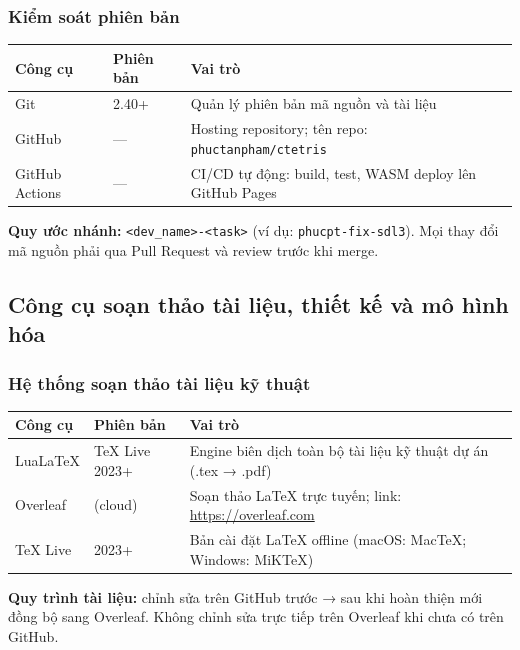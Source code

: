 \documentclass[12pt,a4paper]{article}
\begin{document}
\subsubsection{Kiểm soát phiên bản}

\begin{tabularx}{\linewidth}{|l|l|X|}
\hline
\rowcolor{gray!20}
\textbf{Công cụ} & \textbf{Phiên bản} & \textbf{Vai trò} \\
\hline
Git & 2.40+ & Quản lý phiên bản mã nguồn và tài liệu \\
\hline
GitHub & --- & Hosting repository; tên repo: \texttt{phuctanpham/ctetris} \\
\hline
GitHub Actions & --- & CI/CD tự động: build, test, WASM deploy lên GitHub Pages \\
\hline
\end{tabularx}

\vspace{4pt}
\noindent\textbf{Quy ước nhánh:} \texttt{<dev\_name>-<task>} (ví dụ: \texttt{phucpt-fix-sdl3}).
Mọi thay đổi mã nguồn phải qua Pull Request và review trước khi merge.

\subsection{Công cụ soạn thảo tài liệu, thiết kế và mô hình hóa}

\subsubsection{Hệ thống soạn thảo tài liệu kỹ thuật}

\begin{tabularx}{\linewidth}{|l|l|X|}
\hline
\rowcolor{gray!20}
\textbf{Công cụ} & \textbf{Phiên bản} & \textbf{Vai trò} \\
\hline
LuaLaTeX & TeX Live 2023+ & Engine biên dịch toàn bộ tài liệu kỹ thuật dự án (.tex → .pdf) \\
\hline
Overleaf & (cloud) & Soạn thảo LaTeX trực tuyến; link: \url{https://overleaf.com} \\
\hline
TeX Live & 2023+ & Bản cài đặt LaTeX offline (macOS: MacTeX; Windows: MiKTeX) \\
\hline
\end{tabularx}

\vspace{4pt}
\noindent\textbf{Quy trình tài liệu:} chỉnh sửa trên GitHub trước → sau khi hoàn thiện mới
đồng bộ sang Overleaf. Không chỉnh sửa trực tiếp trên Overleaf khi chưa có trên GitHub.
\end{document}
